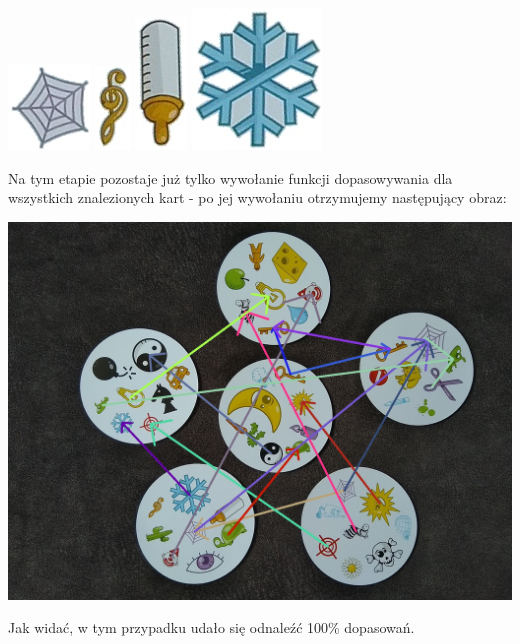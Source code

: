 \documentclass[10pt,a4paper]{article}
\begin{document}
\begin{center}
\includegraphics[scale=0.5]{2.1/card1sign4.jpg}
\includegraphics[scale=0.5]{2.1/card1sign5.jpg}
\includegraphics[scale=0.5]{2.1/card1sign6.jpg}
\includegraphics[scale=0.5]{2.1/card1sign7.jpg}
\end{center}
Na tym etapie pozostaje już tylko wywołanie funkcji dopasowywania dla wszystkich znalezionych kart - po jej wywołaniu otrzymujemy następujący obraz:
\begin{center}
\includegraphics[scale=0.25]{2.1/img_arrows0.jpg}
\end{center}
Jak widać, w tym przypadku udało się odnaleźć 100\% dopasowań.
\newpage
\end{document}
